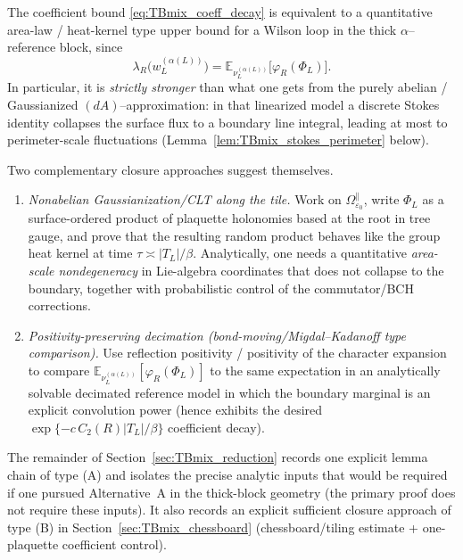 \begin{remark}\label{rem:TBmix_roadmap}
The coefficient bound \eqref{eq:TBmix_coeff_decay} is equivalent to a quantitative area-law / heat-kernel type upper bound for a Wilson loop
in the thick $\alpha$--reference block, since
\[
\lambda_R\!\bigl(w_L^{(\alpha(L))}\bigr)=\mathbb E_{\nu_L^{(\alpha(L))}}\!\big[\varphi_R(\Phi_L)\big].
\]
In particular, it is \emph{strictly stronger} than what one gets from the purely abelian / Gaussianized $(dA)$--approximation:
in that linearized model a discrete Stokes identity collapses the surface flux to a boundary line integral, leading at most to
perimeter-scale fluctuations (Lemma~\ref{lem:TBmix_stokes_perimeter} below).

Two complementary closure approaches suggest themselves.
\begin{enumerate}[leftmargin=*]
\item[(A)] \emph{Nonabelian Gaussianization/CLT along the tile.}
Work on $\Omega_{\varepsilon_0}^{\parallel}$, write $\Phi_L$ as a surface-ordered product of plaquette holonomies based at the root in tree gauge,
and prove that the resulting random product behaves like the group heat kernel at time $\tau\asymp |T_L|/\beta$.
Analytically, one needs a quantitative \emph{area-scale nondegeneracy} in Lie-algebra coordinates that does not collapse to the boundary,
together with probabilistic control of the commutator/BCH corrections.

\item[(B)] \emph{Positivity-preserving decimation (bond-moving/Migdal--Kadanoff type comparison).}
Use reflection positivity / positivity of the character expansion to compare
$\mathbb E_{\nu_L^{(\alpha(L))}}[\varphi_R(\Phi_L)]$ to the same expectation in an analytically solvable
decimated reference model in which the boundary marginal is an explicit convolution power (hence exhibits the desired
$\exp\{-c\,C_2(R)|T_L|/\beta\}$ coefficient decay).
\end{enumerate}

The remainder of Section~\ref{sec:TBmix_reduction} records one explicit lemma chain of type (A) and isolates the precise analytic inputs
that would be required if one pursued Alternative~A in the thick-block geometry (the primary proof does not require these inputs). It also records an explicit sufficient closure approach of type (B)
in Section~\ref{sec:TBmix_chessboard} (chessboard/tiling estimate + one-plaquette coefficient control).
\end{remark}


